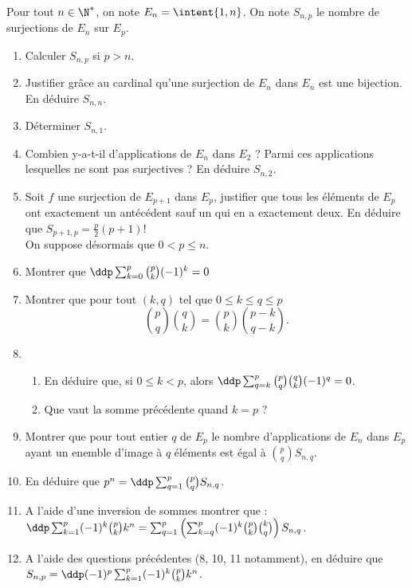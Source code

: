 \begin{exercice}
Pour tout $n\in \N^*$, on note $E_n=\intent{1,n}$. 
On note $S_{n,p}$ le nombre de surjections de $E_n$ sur $E_p$. 
\begin{enumerate}
\item Calculer $S_{n,p}$ si $p>n$. 
\item Justifier grâce au cardinal qu'une surjection de $E_n$ dans $E_n$ est une bijection. En déduire $S_{n,n}$.
\item Déterminer $S_{n,1}$. 
\item Combien y-a-t-il d'applications de $E_n$ dans $E_2$ ? Parmi ces applications lesquelles ne sont pas surjectives ? En déduire $S_{n,2}$. 
\item Soit $f$ une surjection de $E_{p+1}$ dans $E_p$, justifier que tous les éléments de $E_p$ ont exactement un antécédent sauf un qui en a exactement deux. 
En déduire que $S_{p+1,p} = \frac{p}{2}(p+1)!$\\

On suppose désormais que $0< p \leq n$. 
\item Montrer que $\ddp \sum_{k=0}^p \binom{p}{k}(-1)^k=0$
\item Montrer que pour tout $(k,q)$ tel que $0\leq k \leq q \leq p $ 
$$\binom{p}{q}\binom{q}{k}=\binom{p}{k}\binom{p-k}{q-k}.$$
\item \begin{enumerate}
\item En déduire que, si 
$0\leq k <p$, alors $\ddp \sum_{q=k}^p \binom{p}{q}\binom{q}{k} (-1)^q =0$.
\item  Que vaut la somme précédente quand $k=p$ ?
\end{enumerate}

\item Montrer que pour tout entier $q$ de $E_p$ le nombre d'applications de $E_n$ dans $E_p$ ayant un enemble d'image à $q$ éléments est égal à $\binom{p}{q} S_{n,q}$. 
\item En déduire que $p^n =\ddp \sum_{q=1}^p\binom{p}{q} S_{n,q}$. 
\item A l'aide d'une inversion de sommes montrer que : $\ddp \sum_{k=1}^p (-1)^k \binom{p}{k}k^n=\sum_{q=1}^p \left(\sum_{k=q}^p (-1)^k \binom{p}{k}\binom{k}{q} \right) S_{n,q}  $.
\item A l'aide des questions précédentes (8, 10, 11 notamment), en déduire que $S_{n,p} = \ddp (-1)^p \sum_{k=1}^p (-1)^k \binom{p}{k}k^n$.\\


\end{enumerate}
\end{exercice}
